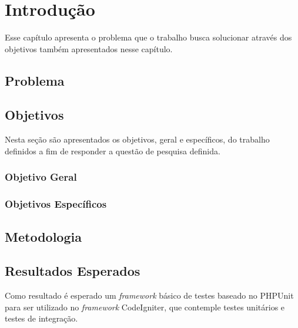 \chapter[Introdução]{Introdução}

Esse capítulo apresenta o problema que o trabalho busca solucionar através dos objetivos também apresentados nesse capítulo.

\section{Problema}

  
\section{Objetivos}

  Nesta seção são apresentados os objetivos, geral e específicos, do trabalho definidos a fim de responder a questão de pesquisa definida.

\subsection{Objetivo Geral}


\subsection{Objetivos Específicos}


\section{Metodologia}

	

\section{Resultados Esperados}

Como resultado é esperado um \textit{framework} básico de testes baseado no PHPUnit para ser utilizado no \textit{framework} CodeIgniter, que contemple
testes unitários e testes de integração.